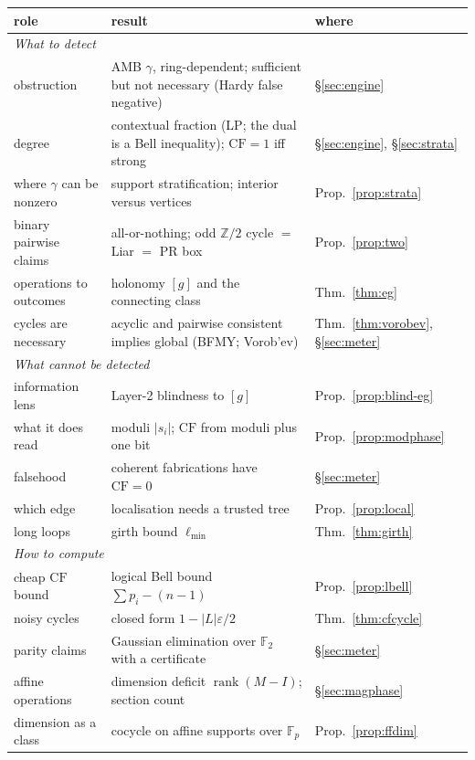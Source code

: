 \documentclass[11pt]{article}
\theoremstyle{definition}
\theoremstyle{remark}
\newcommand{\Z}{\mathbb{Z}}
\newcommand{\F}{\mathbb{F}}
\newcommand{\CF}{\mathrm{CF}}
\begin{document}
\begin{table}[h]\centering\small
\begin{tabular}{p{3.9cm}p{6.6cm}p{2.9cm}}
\toprule
role & result & where\\
\midrule
\multicolumn{3}{l}{\emph{What to detect}}\\
obstruction & AMB $\gamma$, ring-dependent; sufficient but not necessary (Hardy false negative) & \S\ref{sec:engine}\\
degree & contextual fraction (LP; the dual is a Bell inequality); $\CF=1$ iff strong & \S\ref{sec:engine}, \S\ref{sec:strata}\\
where $\gamma$ can be nonzero & support stratification; interior versus vertices & Prop.~\ref{prop:strata}\\
binary pairwise claims & all-or-nothing; odd $\Z/2$ cycle $=$ Liar $=$ PR box & Prop.~\ref{prop:two}\\
operations to outcomes & holonomy $[g]$ and the connecting class & Thm.~\ref{thm:eg}\\
cycles are necessary & acyclic and pairwise consistent implies global (BFMY; Vorob'ev) & Thm.~\ref{thm:vorobev}, \S\ref{sec:meter}\\
\midrule
\multicolumn{3}{l}{\emph{What cannot be detected}}\\
information lens & Layer-2 blindness to $[g]$ & Prop.~\ref{prop:blind-eg}\\
what it does read & moduli $|s_i|$; $\CF$ from moduli plus one bit & Prop.~\ref{prop:modphase}\\
falsehood & coherent fabrications have $\CF=0$ & \S\ref{sec:meter}\\
which edge & localisation needs a trusted tree & Prop.~\ref{prop:local}\\
long loops & girth bound $\ell_{\min}$ & Thm.~\ref{thm:girth}\\
\midrule
\multicolumn{3}{l}{\emph{How to compute}}\\
cheap $\CF$ bound & logical Bell bound $\sum p_i-(n-1)$ & Prop.~\ref{prop:lbell}\\
noisy cycles & closed form $1-|L|\varepsilon/2$ & Thm.~\ref{thm:cfcycle}\\
parity claims & Gaussian elimination over $\F_2$ with a certificate & \S\ref{sec:meter}\\
affine operations & dimension deficit $\operatorname{rank}(M-I)$; section count & \S\ref{sec:magphase}\\
dimension as a class & cocycle on affine supports over $\F_p$ & Prop.~\ref{prop:ffdim}\\

\end{tabular}
\end{table}
\end{document}
